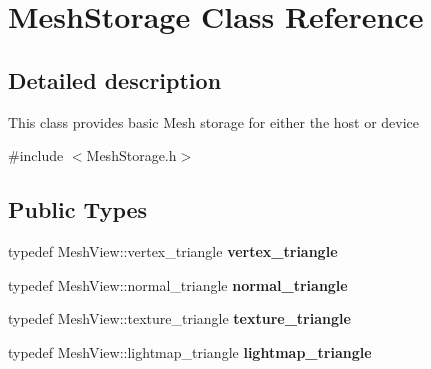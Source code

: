 \hypertarget{class_mesh_storage}{}\section{Mesh\+Storage Class Reference}
\label{class_mesh_storage}


\subsection{Detailed description}
This class provides basic Mesh storage for either the host or device 

{\ttfamily \#include $<$Mesh\+Storage.\+h$>$}

\subsection*{Public Types}
\begin{DoxyCompactItemize}
\item 
\mbox{\label{class_mesh_storage_aafa910e5048de2c56366f4a75990a270}} 
typedef Mesh\+View\+::vertex\+\_\+triangle {\bfseries vertex\+\_\+triangle}
\item 
\mbox{\label{class_mesh_storage_aa5b88deb578cba5e63db24f83a818cff}} 
typedef Mesh\+View\+::normal\+\_\+triangle {\bfseries normal\+\_\+triangle}
\item 
\mbox{\label{class_mesh_storage_a2dea37a55a3e83ea6b387ca879c885ff}} 
typedef Mesh\+View\+::texture\+\_\+triangle {\bfseries texture\+\_\+triangle}
\item 
\mbox{\label{class_mesh_storage_aa8db0d591fb575e006a93970d971e8e1}} 
typedef Mesh\+View\+::lightmap\+\_\+triangle {\bfseries lightmap\+\_\+triangle}
\end{DoxyCompactItemize}
